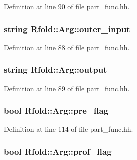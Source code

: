 Definition at line 90 of file part\+\_\+func.\+hh.

\hypertarget{class_rfold_1_1_arg_ae62e02353945f6073c46c27c7f583649}{
\subsubsection[{outer\+\_\+input}]{\setlength{\rightskip}{0pt plus 5cm}string Rfold\+::\+Arg\+::outer\+\_\+input}}\label{class_rfold_1_1_arg_ae62e02353945f6073c46c27c7f583649}


Definition at line 88 of file part\+\_\+func.\+hh.

\hypertarget{class_rfold_1_1_arg_a172c943d9eafc1bfc27fde48db831f5d}{
\subsubsection[{output}]{\setlength{\rightskip}{0pt plus 5cm}string Rfold\+::\+Arg\+::output}}\label{class_rfold_1_1_arg_a172c943d9eafc1bfc27fde48db831f5d}


Definition at line 89 of file part\+\_\+func.\+hh.

\hypertarget{class_rfold_1_1_arg_a8a7ca4df7e6085e8cc4af60917c99a92}{
\subsubsection[{pre\+\_\+flag}]{\setlength{\rightskip}{0pt plus 5cm}bool Rfold\+::\+Arg\+::pre\+\_\+flag}}\label{class_rfold_1_1_arg_a8a7ca4df7e6085e8cc4af60917c99a92}


Definition at line 114 of file part\+\_\+func.\+hh.

\hypertarget{class_rfold_1_1_arg_ada0e4aafdcedc01f9891d523f2626226}{
\subsubsection[{prof\+\_\+flag}]{\setlength{\rightskip}{0pt plus 5cm}bool Rfold\+::\+Arg\+::prof\+\_\+flag}}\label{class_rfold_1_1_arg_ada0e4aafdcedc01f9891d523f2626226}


